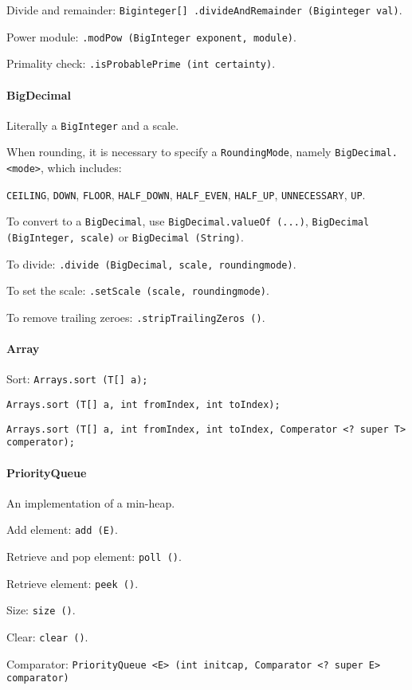 Divide and remainder: \texttt{Biginteger[] .divideAndRemainder (Biginteger val)}.

Power module: \texttt{.modPow (BigInteger exponent, module)}.

Primality check: \texttt{.isProbablePrime (int certainty)}.

\paragraph{BigDecimal}
Literally a \texttt{BigInteger} and a scale.

When rounding, it is necessary to specify a \texttt{RoundingMode}, namely \texttt{BigDecimal.<mode>}, which includes: 

\texttt{CEILING}, \texttt{DOWN}, \texttt{FLOOR}, \texttt{HALF\_DOWN}, \texttt{HALF\_EVEN}, \texttt{HALF\_UP}, \texttt{UNNECESSARY}, \texttt{UP}.

To convert to a \texttt{BigDecimal}, use \texttt{BigDecimal.valueOf (...)}, \texttt{BigDecimal (BigInteger, scale)} or \texttt{BigDecimal (String)}.

To divide: \texttt{.divide (BigDecimal, scale, roundingmode)}.

To set the scale: \texttt{.setScale (scale, roundingmode)}.

To remove trailing zeroes: \texttt{.stripTrailingZeros ()}.

\paragraph{Array}
Sort: \texttt{Arrays.sort (T[] a);}

\texttt{Arrays.sort (T[] a, int fromIndex, int toIndex);}

\texttt{Arrays.sort (T[] a, int fromIndex, int toIndex, Comperator <? super T> comperator);}

\paragraph{PriorityQueue}
An implementation of a min-heap.

Add element: \texttt{add (E)}.

Retrieve and pop element: \texttt{poll ()}.

Retrieve element: \texttt{peek ()}.

Size: \texttt{size ()}.

Clear: \texttt{clear ()}.

Comparator: \texttt{PriorityQueue <E> (int initcap, Comparator <? super E> comparator)}

